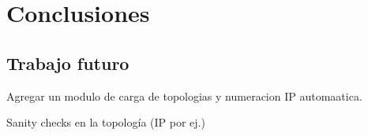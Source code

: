 \chapter{Conclusiones}

\graphicspath{{Chapter5/Figs/}}

\section{Trabajo futuro}
Agregar un modulo de carga de topologias y numeracion IP automaatica.

Sanity checks en la topología (IP por ej.)